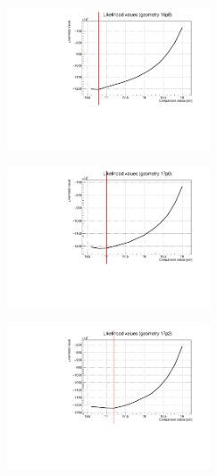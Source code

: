 \documentclass[a4paper, 11pt, twoside, openright]{report}
\begin{document}
\begin{figure}[htbp]
\centering
\begin{minipage}[b]{.32\textwidth}
\includegraphics[width=6cm, height=4.6cm]{figs/likelihood100HighStat/likelihood16p8.pdf}
\end{minipage}\hfill
\begin{minipage}[b]{.32\textwidth}
\includegraphics[width=6cm, height=4.6cm]{figs/likelihood100HighStat/likelihood17p0.pdf}
\end{minipage} \hfill
\begin{minipage}[b]{.32\textwidth}
\includegraphics[width=6cm, height=4.6cm]{figs/likelihood100HighStat/likelihood17p2.pdf}
\end{minipage} \hfill \vspace{10pt}


\end{figure}
\end{document}
